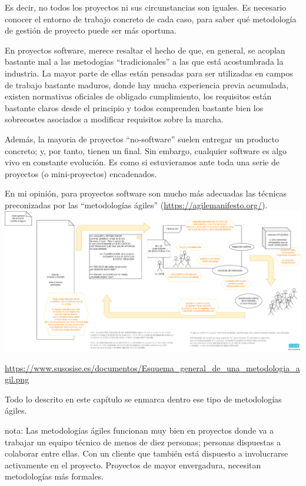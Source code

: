 \documentclass[spanish,12pt,a4paper,final,oneside]{book}
\begin{document}
Es decir, no todos los proyectos ni sus circunstancias son iguales. Es necesario conocer el entorno de trabajo concreto de cada caso, para saber qué metodología de gestión de proyecto puede ser más oportuna.

En proyectos software, merece resaltar el hecho de que, en general, se acoplan bastante mal a las metodogias ``tradicionales'' a las que está acostumbrada la industria. La mayor parte de ellas están pensadas para ser utilizadas en campos de trabajo bastante maduros, donde hay mucha experiencia previa acumulada, existen normativas oficiales de obligado cumplimiento, los requisitos están bastante claros desde el principio y todos comprenden bastante bien los sobrecostes asociados a modificar requisitos sobre la marcha.

Además, la mayoria de proyectos ``no-software'' suelen entregar un producto concreto; y, por tanto, tienen un final. Sin embargo, cualquier software es algo vivo en constante evolución. Es como si estuvieramos ante toda una serie de proyectos (o mini-proyectos) encadenados.

En mi opinión, para proyectos software son mucho más adecuadas las técnicas preconizadas por las ``metodologías ágiles'' (\url{https://agilemanifesto.org/}).
\\
\includegraphics[width=\textwidth]{Esquema_general_de_una_metodologia_agil} 
\begin{flushright}
\begin{scriptsize}
\url{https://www.susosise.es/documentos/Esquema_general_de_una_metodologia_agil.png}
\end{scriptsize}
\end{flushright}

Todo lo descrito en este capítulo se enmarca dentro ese tipo de metodologías ágiles.

nota: Las metodologías ágiles funcionan muy bien en proyectos donde va a trabajar un equipo técnico de menos de diez personas; personas dispuestas a colaborar entre ellas. Con un cliente que también está dispuesto a involucrarse activamente en el proyecto. Proyectos de mayor envergadura, necesitan metodologías más formales.
\end{document}
